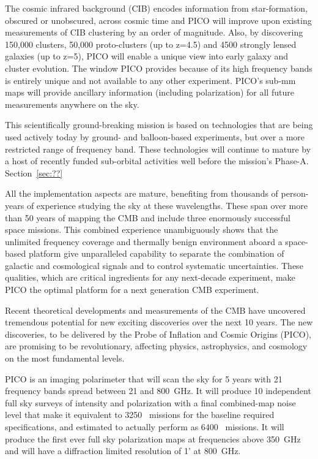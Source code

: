 \documentclass[PICOReport.tex]{subfiles}
\begin{document}
The cosmic infrared background (CIB) encodes information from star-formation, obscured or unobscured, across cosmic time and PICO will improve upon existing measurements of CIB clustering by an order of magnitude.  Also, by discovering 150,000 clusters, 50,000 proto-clusters (up to z=4.5) and 4500 strongly lensed galaxies (up to z=5), PICO will enable a unique view into early galaxy and cluster evolution. The window PICO provides because of its high frequency bands is entirely unique and not available to any other experiment.  PICO's sub-mm maps will provide ancillary information (including polarization) for all future measurements anywhere on the sky.  

This scientifically ground-breaking mission is based on technologies that are being used actively today by ground- and balloon-based experiments, but over a more restricted range of frequency band. These technologies will continue to mature by a host of recently funded sub-orbital activities well before the mission's Phase-A. Section~\ref{sec:??}

All the implementation aspects are mature, benefiting from thousands of person-years of experience studying the sky at these wavelengths. These span over more than 50 years of mapping the CMB and include three enormously successful space missions. This combined experience unambiguously shows that the unlimited frequency coverage and thermally benign environment aboard a space-based platform give unparalleled capability to separate the combination of galactic and cosmological signals and to control systematic uncertainties. These qualities, which are critical ingredients for any next-decade experiment, make PICO the optimal platform for a next generation CMB experiment.


Recent theoretical developments and measurements of the \ac{CMB} have uncovered tremendous potential for new exciting discoveries over the next 10 years. The new discoveries, to be delivered by the Probe of Inflation and Cosmic Origins (PICO), are promising to be revolutionary, affecting physics, astrophysics, and cosmology on the most fundamental levels. 

PICO is an imaging polarimeter that will scan the sky for 5 years with 21 frequency bands spread between 21 and 800~GHz. It will produce 10 independent full sky surveys of intensity and polarization with a final combined-map noise level that make it equivalent to 3250 \planck\ missions for the baseline required specifications, and estimated to actually perform as 6400 \planck\ missions. It will produce the first ever full sky polarization maps at frequencies above 350~GHz and will have a diffraction limited resolution of 1' at 800~GHz. 
\end{document}
